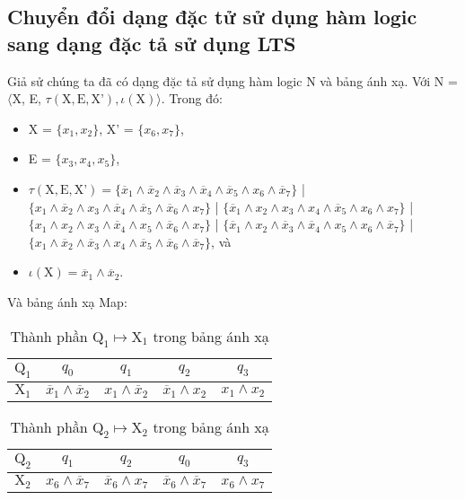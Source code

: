 \documentclass[a4paper,13pt,oneside,openany]{book}
\begin{document}
\begin{flushleft}
	\section{Chuyển đổi dạng đặc tử sử dụng hàm logic sang dạng đặc tả sử dụng LTS}
	Giả sử chúng ta đã có dạng đặc tả sử dụng hàm logic N và bảng ánh xạ. Với	N = $\langle$X, E, $\tau(\textrm{X}, \textrm{E}, \textrm{X'}), \iota(\textrm{X})\rangle$. Trong đó:
	\begin{itemize}
		\item X = $\{x_1, x_2\}$, X' = $\{x_6, x_7\}$,
		\item E = $\{x_3, x_4, x_5\}$,
		\item $\tau(\textrm{X}, \textrm{E}, \textrm{X'}) = \{\overline{x}_1 \land \overline{x}_2 \land \overline{x}_3 \land \overline{x}_4 \land \overline{x}_5 \land x_6 \land \overline{x}_7 \}$ | $\{x_1 \land \overline{x}_2 \land x_3 \land \overline{x}_4 \land \overline{x}_5 \land \overline{x}_6 \land x_7 \}$ | $\{\overline{x}_1 \land x_2 \land x_3 \land x_4 \land \overline{x}_5 \land x_6 \land x_7\}$ | $\{x_1 \land x_2 \land x_3 \land \overline{x}_4 \land x_5 \land \overline{x}_6 \land x_7\}$ | $\{\overline{x}_1 \land x_2 \land \overline{x}_3 \land \overline{x}_4 \land x_5 \land x_6 \land \overline{x}_7\}$ | $\{x_1 \land \overline{x}_2 \land \overline{x}_3 \land x_4 \land \overline{x}_5 \land \overline{x}_6 \land \overline{x}_7\}$, và
		\item $\iota(\textrm{X}) = \overline{x}_1 \land \overline{x}_2$.
	\end{itemize}
	Và bảng ánh xạ Map:
	\begin{table}[!ht]
		\centering
		\renewcommand{\arraystretch}{1.25}
		\begin{tabular}{|c|c|c|c|c|}
			\hline
			$\textrm{Q}_1$ & $q_0$ & $q_1$ & $q_2$ & $q_3$\\
			\hline
			$\textrm{X}_1$ & $\overline{x}_1 \land \overline{x}_2$ & $x_1\land\overline{x}_2$&$\overline{x}_1\land x_2$ &
			$x_1 \land x_2$\\
			\hline
		\end{tabular}
		\caption{Thành phần $\textrm{Q}_1 \mapsto \textrm{X}_1$ trong bảng ánh xạ}
	\end{table}

	\begin{table}[!ht]
		\centering
		\renewcommand{\arraystretch}{1.25}
		\begin{tabular}{|c|c|c|c|c|}
			\hline
			$\textrm{Q}_2$ & $q_1$ & $q_2$ & $q_0$ & $q_3$\\
			\hline
			$\textrm{X}_2$ & $x_6 \land \overline{x}_7$ & $\overline{x}_6\land x_7$ & $\overline{x}_6\land \overline{x}_7$ &
			$x_6 \land x_7$\\
			\hline
		\end{tabular}
		\caption{Thành phần $\textrm{Q}_2 \mapsto \textrm{X}_2$ trong bảng ánh xạ}
	\end{table}


\end{flushleft}
\end{document}
